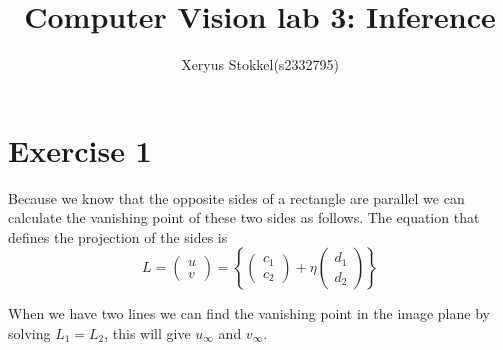 \documentclass[a4paper]{article}
\author{Xeryus Stokkel(s2332795)}
\title{Computer Vision lab 3: Inference}
\begin{document}
\maketitle

\section*{Exercise 1}
Because we know that the opposite sides of a rectangle are parallel we can calculate the vanishing point of these two sides as follows. The equation that defines the projection of the sides is
\[ L = \left(\begin{array}{c}u\\v\end{array}\right) = \left\{ \left(\begin{array}{c} c_1\\c_2\end{array} \right) + \eta \left(\begin{array}{c} d_1\\d_2\end{array}\right) \right\} \]

When we have two lines we can find the vanishing point in the image plane by solving $L_1 = L_2$, this will give $u_\infty$ and $v_\infty$.
\end{document}
